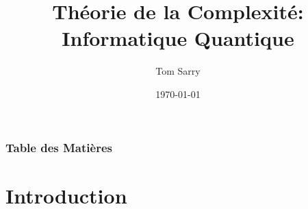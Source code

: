 \documentclass{beamer}
\title[Th\'eorie de la Complexit\'e Quantique]{Th\'eorie de la Complexit\'e: \\Informatique Quantique}
\author{Tom Sarry}
\institute[UdeM]{Universit\'e de Montr\'eal}
\date[April 2023]{\today}
\begin{document}
\frame{\titlepage}

\begin{frame}
  \frametitle{Table des Mati\`eres}
  \tableofcontents
\end{frame}


\section{Introduction}
\end{document}

